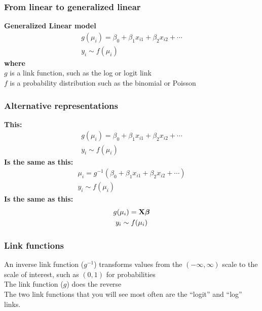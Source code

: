 \documentclass[color=usenames,dvipsnames]{beamer}\usepackage[]{graphicx}\usepackage[]{color}
\begin{document}
\begin{frame}
  \frametitle{From linear to generalized linear}
  {\bf Generalized Linear model}
  \begin{gather*}
    g(\mu_i) = \beta_0 + \beta_1 x_{i1} + \beta_2 x_{i2} + \cdots \\
    y_i \sim f(\mu_i)
  \end{gather*}
  \pause
  {\bf where} \\
  $g$ is a link function, such as the log or logit link \\
  \pause
  $f$ is a probability distribution such as the binomial or Poisson
\end{frame}


\begin{frame}
  \frametitle{Alternative representations}
  {\bf This:}
  \begin{gather*}
    g(\mu_i) = \beta_0 + \beta_1 x_{i1} + \beta_2 x_{i2} + \cdots \\
    y_i \sim f(\mu_i)
  \end{gather*}
  \pause
  {\bf Is the same as this:}
  \begin{gather*}
    \mu_i = g^{-1}(\beta_0 + \beta_1 x_{i1} + \beta_2 x_{i2} + \cdots) \\
    y_i \sim f(\mu_i)
  \end{gather*}
  \pause
  {\bf Is the same as this:}
  \begin{gather*}
    g(\mu_i) = {\bf X}{\bm \beta} \\
    y_i \sim f(\mu_i)
  \end{gather*}
\end{frame}


\begin{frame}
  \frametitle{Link functions}
  An inverse link function ($g^{-1}$) transforms values from the $(-\infty,\infty)$
  scale to the scale of interest, such as $(0,1)$ for probabilities  \\
  \pause
  \vfill
  The link function ($g$) does the reverse \\
  \pause
  \vfill
  The two link functions that you will see most often are the
      ``logit'' and ``log'' links.
\end{frame}
\end{document}
